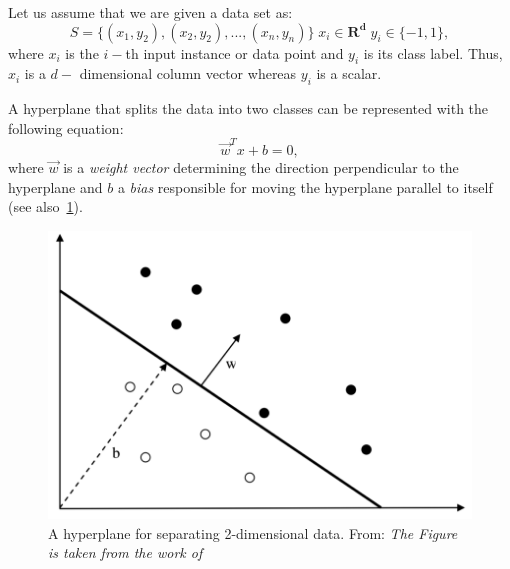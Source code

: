 Let us assume that we are given a data set as:
\[  S = \{(x_1,y_2), (x_2,y_2), ...,(x_n,y_n) \} \; x_i \in \mathbf{R^d} \; y_i \in \{-1,1\}, \]
where \( x_i\) is the \( i-\)th input instance or data point and \( y_i\) is its class label. Thus, \(x_i\) is a \(d-\) dimensional column vector whereas \( y_i\) is a scalar.

A hyperplane that splits the data into two classes can be represented with the following equation:
\[\vec{w}^Tx + b = 0, \] 
where \(\vec{w}\) is a \textit{weight vector} determining the direction perpendicular to the hyperplane and \(b\) a \textit{bias} responsible for moving the hyperplane parallel to itself (see also~\ref{fig:hyperplane1}).

\begin{figure}[h!]
    \centering %
    \includegraphics[scale=0.6]{Graphics/svm1.png}
    \caption{
        A hyperplane for separating 2-dimensional data.\newline
        From: \textit{The Figure is taken from the work of}~\protect\cite{Okun;Valentini:2009}
    }
    \label{fig:hyperplane1}
\end{figure}

